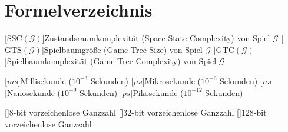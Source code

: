 \chapter*{Formelverzeichnis}

\DeclareSIUnit{}

\newcommand{\acrounit}[1]{
    \acroextra{\makebox[13mm][l]{\si[per-mode=fraction,fraction-function=\sfrac]{#1}}}
}
\def\acrospace{\acroextra{\makebox[14.375mm][l]{}}}


\begin{acronym}[WYSISWG] %


    [\ensuremath{\text{SSC}(\mathcal{G})}]{Zustandsraumkomplexität (Space-State Complexity) von Spiel $\mathcal{G}$}
    [\ensuremath{\text{GTS}(\mathcal{G})}]{Spielbaumgröße (Game-Tree Size) von Spiel $\mathcal{G}$}
    [\ensuremath{\text{GTC}(\mathcal{G})}]{Spielbaumkomplexität (Game-Tree Complexity) von Spiel $\mathcal{G}$}

    \vspace{1.2cm}

    [\ensuremath{ms}]{Millisekunde ($10^{-3}$ Sekunden)}
    [\ensuremath{\mu{}s}]{Mikrosekunde ($10^{-6}$ Sekunden)}
    [\ensuremath{ns}]{Nanosekunde ($10^{-9}$ Sekunden)}
    [\ensuremath{ps}]{Pikosekunde ($10^{-12}$ Sekunden)}

    \vspace{1.2cm}

    []{8-bit vorzeichenlose Ganzzahl}
    []{32-bit vorzeichenlose Ganzzahl}
    []{128-bit vorzeichenlose Ganzzahl}




\end{acronym}
